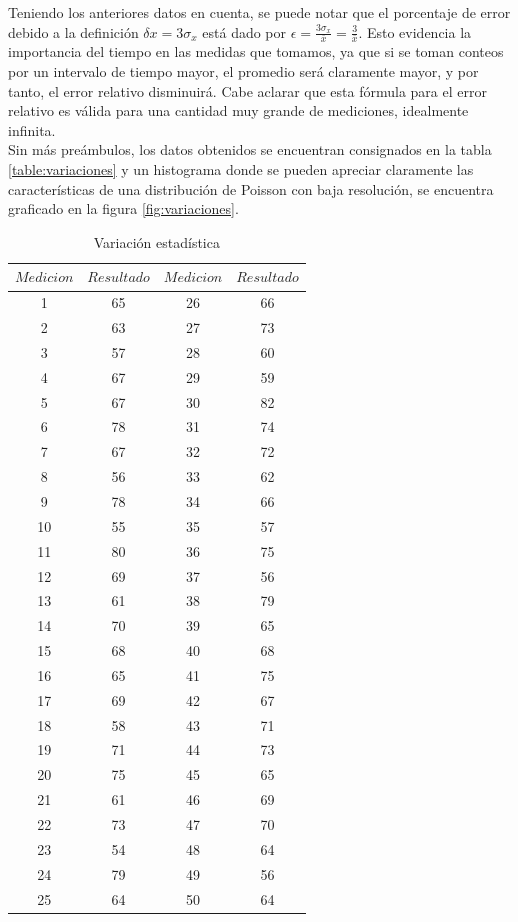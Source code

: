 \documentclass[%
 reprint,
 amsmath,amssymb,
 aps,
]{revtex4-1}
\begin{document}
Teniendo los anteriores datos en cuenta, se puede notar que el porcentaje de error debido a la definición $\delta x = 3\sigma_x$ está dado por $\epsilon = \frac{3\sigma_x}{\bar{x}} = \frac{3}{\bar{x}}$. Esto evidencia la importancia del tiempo en las medidas que tomamos, ya que si se toman conteos por un intervalo de tiempo mayor, el promedio será claramente mayor, y por tanto, el error relativo disminuirá. Cabe aclarar que esta fórmula para el error relativo es válida para una cantidad muy grande de mediciones, idealmente infinita.\\

Sin más preámbulos, los datos obtenidos se encuentran consignados en la tabla \ref{table:variaciones} y un histograma donde se pueden apreciar claramente las características de una distribución de Poisson con baja resolución, se encuentra graficado en la figura \ref{fig:variaciones}.\\

\begin{table}[h!]
\centering
\begin{tabular}{|c|c|c|c|}
	\hline $ Medicion $ & $Resultado$ & $ Medicion $ & $Resultado$ \\ 
	\hline\hline
	1&65&26&66\\
	2&63&27&73\\
	3&57&28&60\\
	4&67&29&59\\
	5&67&30&82\\
	6&78&31&74\\
	7&67&32&72\\
	8&56&33&62\\
	9&78&34&66\\
	10&55&35&57\\
	11&80&36&75\\
	12&69&37&56\\
	13&61&38&79\\
	14&70&39&65\\
	15&68&40&68\\
	16&65&41&75\\
	17&69&42&67\\
	18&58&43&71\\
	19&71&44&73\\
	20&75&45&65\\
	21&61&46&69\\
	22&73&47&70\\
	23&54&48&64\\
	24&79&49&56\\
	25&64&50&64\\	
		[1ex] 
 \hline
 \end{tabular} 
  \caption{Variación estadística}
\label{table:Variaciones} 
\end{table}
\end{document}
